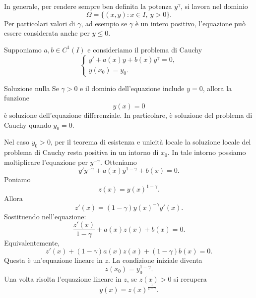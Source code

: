 \documentclass[a4paper]{article}
\begin{document}
\begin{radioactive}
In generale, per rendere sempre ben definita la potenza \(y^\gamma\), si lavora nel dominio
\[
    \Omega=\{(x,y):x\in I,\ y>0\}.
\]
Per particolari valori di \(\gamma\), ad esempio se \(\gamma\) è un intero positivo, l'equazione può essere considerata anche per \(y\leq 0\).

Supponiamo \(a,b\in C^1(I)\) e consideriamo il problema di Cauchy
\[
    \begin{cases}
        y'+a(x)y+b(x)y^\gamma=0,\\
        y(x_0)=y_0.
    \end{cases}
\]
\end{radioactive}

\begin{radioactive}
\begin{snippetproposition}{Soluzione nulla}
    Se \(\gamma>0\) e il dominio dell'equazione include \(y=0\), allora la funzione
    \[
        y(x)=0
    \]
    è soluzione dell'equazione differenziale. In particolare, è soluzione del problema di Cauchy quando \(y_0=0\).
\end{snippetproposition}
\end{radioactive}

\begin{radioactive}
Nel caso \(y_0>0\), per il teorema di esistenza e unicità locale la soluzione locale del problema di Cauchy resta positiva in un intorno di \(x_0\). In tale intorno possiamo moltiplicare l'equazione per \(y^{-\gamma}\). Otteniamo
\[
    y'y^{-\gamma}+a(x)y^{1-\gamma}+b(x)=0.
\]
Poniamo
\[
    z(x)=y(x)^{1-\gamma}.
\]
Allora
\[
    z'(x)=(1-\gamma)y(x)^{-\gamma}y'(x).
\]
Sostituendo nell'equazione:
\[
    \frac{z'(x)}{1-\gamma}+a(x)z(x)+b(x)=0.
\]
Equivalentemente,
\[
    z'(x)+(1-\gamma)a(x)z(x)+(1-\gamma)b(x)=0.
\]
Questa è un'equazione lineare in \(z\). La condizione iniziale diventa
\[
    z(x_0)=y_0^{1-\gamma}.
\]
Una volta risolta l'equazione lineare in \(z\), se \(z(x)>0\) si recupera
\[
    y(x)=z(x)^{\frac{1}{1-\gamma}}.
\]
\end{radioactive}
\end{document}
